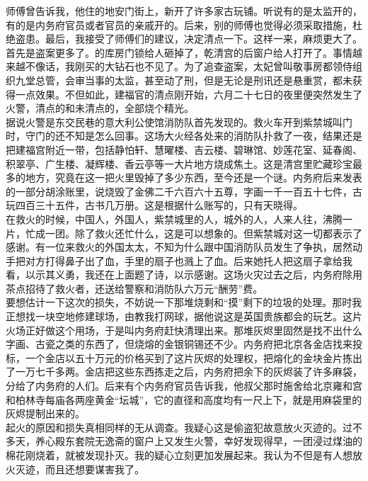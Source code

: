 师傅曾告诉我，他住的地安门街上，新开了许多家古玩铺。听说有的是太监开的，有的是内务府官员或者官员的亲戚开的。后来，别的师傅也觉得必须采取措施，杜绝盗患。最后，我接受了师傅们的建议，决定清点一下。这样一来，麻烦更大了。\\

首先是盗案更多了。的库房门锁给人砸掉了，乾清宫的后窗户给人打开了。事情越来越不像话，我刚买的大钻石也不见了。为了追查盗案，太妃曾叫敬事房都领侍组织九堂总管，会审当事的太监，甚至动了刑，但是无论是刑讯还是悬重赏，都未获得一点效果。不但如此，建福官的清点刚开始，六月二十七日的夜里便突然发生了火警，清点的和未清点的，全部烧个精光。\\

据说火警是东交民巷的意大利公使馆消防队首先发现的。救火车开到紫禁城叫门时，守门的还不知是怎么回事。这场大火经各处来的消防队扑救了一夜，结果还是把建福宫附近一带，包括静怕轩、慧曜楼、吉云楼、碧琳馆、妙莲花室、延春阁、积翠亭、广生楼、凝辉楼、香云亭等一大片地方烧成焦土。这是清宫里贮藏珍宝最多的地方，究竟在这一把火里毁掉了多少东西，至今还是一个谜。内务府后来发表的一部分胡涂账里，说烧毁了金佛二千六百六十五尊，字画一千一百五十七件，古玩四百三十五件，古书几万册。这是根据什么账写的，只有天晓得。\\

在救火的时候，中国人，外国人，紫禁城里的人，城外的人，人来人往，沸腾一片，忙成一团。除了救火还忙什么，这是可以想象的。但紫禁城对这一切都表示了感谢。有一位来救火的外国太太，不知为什么跟中国消防队员发生了争执，居然动手把对方打得鼻子出了血，手里的扇子也溅上了血。后来她托人把这扇子拿给我看，以示其义勇，我还在上面题了诗，以示感谢。这场火灾过去之后，内务府除用茶点招待了救火者，还送给警察和消防队六万元“酬劳”费。\\

要想估计一下这次的损失，不妨说一下那堆烧剩和“摸”剩下的垃圾的处理。那时我正想找一块空地修建球场，由教我打网球，据他说这是英国贵族都会的玩艺。这片火场正好做这个用场，于是叫内务府赶快清理出来。那堆灰烬里固然是找不出什么字画、古瓷之类的东西了，但烧熔的金银铜锡还不少。内务府把北京各金店找来投标，一个金店以五十万元的价格买到了这片灰烬的处理权，把熔化的金块金片拣出了一万七千多两。金店把这些东西拣走之后，内务府把余下的灰烬装了许多麻袋，分给了内务府的人们。后来有个内务府官员告诉我，他叔父那时施舍给北京雍和宫和柏林寺每庙各两座黄金“坛城”，它的直径和高度均有一尺上下，就是用麻袋里的灰烬提制出来的。\\

起火的原因和损失真相同样的无从调查。我疑心这是偷盗犯故意放火灭迹的。过不多天，养心殿东套院无逸斋的窗户上又发生火警，幸好发现得早，一团浸过煤油的棉花刚烧着，就被发现扑灭。我的疑心立刻更加发展起来。我认为不但是有人想放火灭迹，而且还想要谋害我了。\\

